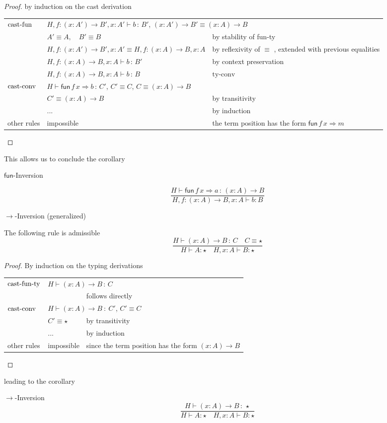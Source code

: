 \begin{proof}
by induction on the cast derivation

\begin{tabular}{lll}
$\operatorname{cast-fun}$ & \multicolumn{2}{l}{$H,f:\left(x:A'\right)\rightarrow B',x:A'\vdash b\,:\,B'$, $\left(x:A'\right)\rightarrow B'\equiv\left(x:A\right)\rightarrow B$}\tabularnewline
 & $A'\equiv A,\quad B'\equiv B$ & by stability of fun-ty\tabularnewline
 & $H,f:\left(x:A'\right)\rightarrow B',x:A'\equiv H,f:\left(x:A\right)\rightarrow B,x:A$ & by reflexivity of $\equiv$ , extended with previous equalities\tabularnewline
 & $H,f:\left(x:A\right)\rightarrow B,x:A\vdash b\,:\,B'$ & by context preservation\tabularnewline
 & $H,f:\left(x:A\right)\rightarrow B,x:A\vdash b\,:\,B$ & $\textrm{ty-conv}$\tabularnewline
$\operatorname{cast-conv}$ & \multicolumn{2}{l}{$H\vdash\mathsf{fun}\,f\,x\Rightarrow b\,:\,C'$, $C'\equiv C$, $C\equiv\left(x:A\right)\rightarrow B$}\tabularnewline
 & $C'\equiv\left(x:A\right)\rightarrow B$ & by transitivity\tabularnewline
 & ... & by induction\tabularnewline
other rules & impossible & the term position has the form $\mathsf{fun}\,f\,x\Rightarrow m$\tabularnewline
\end{tabular}
\end{proof}
This allows us to conclude the corollary 
\begin{cor}
$\mathsf{fun}$-Inversion 

\[
\frac{H\vdash\mathsf{fun}\,f\,x\Rightarrow a\,:\,\left(x:A\right)\rightarrow B}{H,f:\left(x:A\right)\rightarrow B,x:A\vdash b:B}
\]
\end{cor}

\begin{lem}
$\rightarrow$-Inversion (generalized)

The following rule is admissible
\[
\frac{H\vdash\left(x:A\right)\rightarrow B\,:\,C\quad C\equiv\star}{H\vdash A:\star\quad H,x:A\vdash B:\star}
\]
\end{lem}

\begin{proof}
By induction on the typing derivations

\begin{tabular}{lll}
$\operatorname{cast-fun-ty}$ & \multicolumn{2}{l}{$H\vdash\left(x:A\right)\rightarrow B\,:\,C$}\tabularnewline
 &  & follows directly\tabularnewline
$\operatorname{cast-conv}$ & \multicolumn{2}{l}{$H\vdash\left(x:A\right)\rightarrow B\::\:C'$, $C'\equiv C$}\tabularnewline
 & $C'\equiv\star$ & by transitivity\tabularnewline
 & ... & by induction\tabularnewline
other rules & impossible & since the term position has the form $\left(x:A\right)\rightarrow B$\tabularnewline
\end{tabular}
\end{proof}
leading to the corollary
\begin{cor}
$\rightarrow$-Inversion
\[
\frac{H\vdash\left(x:A\right)\rightarrow B\,:\,\star}{H\vdash A:\star\quad H,x:A\vdash B:\star}
\]
\end{cor}

